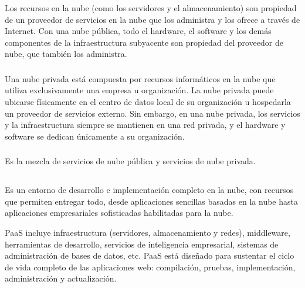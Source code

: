 \documentclass[10pt,a4paper]{article} %
\begin{document}
	\subsubsection{}
	{\large Los recursos en la nube (como los servidores y el almacenamiento) son propiedad de un proveedor de servicios en la nube que los administra y los ofrece a trav{\'e}s de Internet. Con una nube p{\'u}blica, todo el hardware, el software y los dem{\'a}s componentes de la infraestructura subyacente son propiedad del proveedor de nube, que tambi{\'e}n los administra. }
	
	\subsubsection{\color{colorESCOM}{Nubes privadas:}}
	{\large Una nube privada est{\'a} compuesta por recursos inform{\'a}ticos en la nube que utiliza exclusivamente una empresa u organizaci{\'o}n. La nube privada puede ubicarse f{\'i}sicamente en el centro de datos local de su organizaci{\'o}n u hospedarla un proveedor de servicios externo. Sin embargo, en una nube privada, los servicios y la infraestructura siempre se mantienen en una red privada, y el hardware y software se dedican {\'u}nicamente a su organizaci{\'o}n. }
	
	\subsubsection{\color{colorESCOM}{Nubes hibridas:}}
	{\large Es la mezcla de servicios de nube p{\'u}blica y servicios de nube privada. 
		
		
		\vspace{0.5cm}}
	
	\subsection{ \color{colorESCOM}{Plataforma como Servicio (PAAS):}}
	{\large Es un entorno de desarrollo e implementaci{\'o}n completo en la nube, con recursos que permiten entregar todo, desde aplicaciones sencillas basadas en la nube hasta aplicaciones empresariales sofisticadas habilitadas para la nube.
		
		
		\vspace{0.5cm}
		PaaS incluye infraestructura (servidores, almacenamiento y redes), middleware, herramientas de desarrollo, servicios de inteligencia empresarial, sistemas de administraci{\'o}n de bases de datos, etc. PaaS est{\'a} dise{\~n}ado para sustentar el ciclo de vida completo de las aplicaciones web: compilaci{\'o}n, pruebas, implementaci{\'o}n, administraci{\'o}n y actualizaci{\'o}n.}
	
\end{document}
